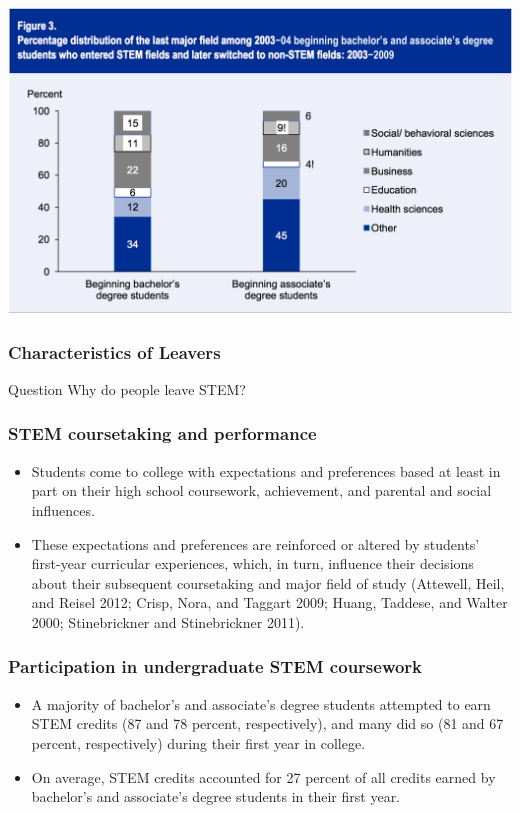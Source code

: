 \documentclass{beamer}
\begin{document}
\begin{frame}
  \centering
  \includegraphics[scale = 0.25]{pic3.png}
\end{frame}

\begin{frame}
  \frametitle{Characteristics of Leavers}
  \begin{block}{Question}
    Why do people leave STEM?
  \end{block}
\end{frame}

\begin{frame}
  \frametitle{STEM coursetaking and performance}
  \begin{itemize}
  \item Students come to college with expectations and preferences based at least in part on
    their high school coursework, achievement, and parental and social influences.
    
  \item These expectations and preferences are reinforced or altered by students’ first-year curricular
experiences, which, in turn, influence their decisions about their subsequent
coursetaking and major field of study (Attewell, Heil, and Reisel 2012; Crisp, Nora,
and Taggart 2009; Huang, Taddese, and Walter 2000; Stinebrickner and
Stinebrickner 2011).
\end{itemize}
\end{frame}

\begin{frame}
  \frametitle{Participation in undergraduate STEM coursework}

  \begin{itemize}
  \item A majority of bachelor’s and associate’s degree students attempted to earn STEM
credits (87 and 78 percent, respectively), and many did so (81 and 67 percent,
respectively) during their first year in college. 

\item On average, STEM credits accounted for 27 percent of all credits earned by bachelor’s and associate’s degree
students in their first year. 
  \end{itemize}
\end{frame}
\end{document}
